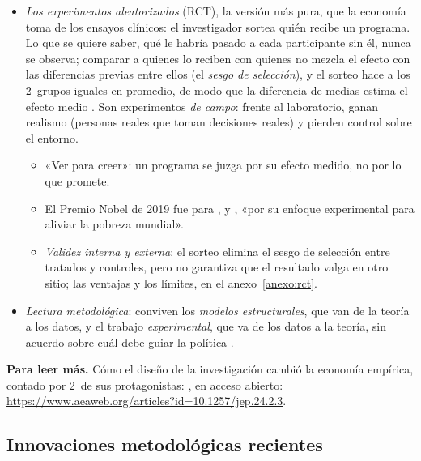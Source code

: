 \documentclass[11pt]{article}
\begin{document}
\begin{itemize}
\item \emph{Los experimentos aleatorizados} (RCT), la versión más pura, que la economía toma de los ensayos clínicos: el investigador sortea quién recibe un programa. Lo que se quiere saber, qué le habría pasado a cada participante sin él, nunca se observa; comparar a quienes lo reciben con quienes no mezcla el efecto con las diferencias previas entre ellos (el \emph{sesgo de selección}), y el sorteo hace a los 2~grupos iguales en promedio, de modo que la diferencia de medias estima el efecto medio\nocite{AngristPischke2009} . Son experimentos \emph{de campo}: frente al laboratorio, ganan realismo (personas reales que toman decisiones reales) y pierden control sobre el entorno.
  \begin{itemize}
  \item «Ver para creer»: un programa se juzga por su efecto medido, no por lo que promete.
  \item El Premio Nobel de 2019 fue para ,  y , «por su enfoque experimental para aliviar la pobreza mundial»\nocite{NobelPrize2019}.
  \item \emph{Validez interna y externa}: el sorteo elimina el sesgo de selección entre tratados y controles, pero no garantiza que el resultado valga en otro sitio; las ventajas y los límites, en el anexo~\ref{anexo:rct}.
  \end{itemize}
\item \emph{Lectura metodológica}: conviven los \emph{modelos estructurales}, que van de la teoría a los datos, y el trabajo \emph{experimental}, que va de los datos a la teoría, sin acuerdo sobre cuál debe guiar la política .
\end{itemize}

\begin{anotaciones}
\textbf{Para leer más.} Cómo el diseño de la investigación cambió la economía empírica, contado por 2~de sus protagonistas: \textcite{AngristPischke2010Credibility}, en acceso abierto: \url{https://www.aeaweb.org/articles?id=10.1257/jep.24.2.3}.
\end{anotaciones}

\subsection{Innovaciones metodológicas recientes}\label{sec:innovaciones}
\end{document}
